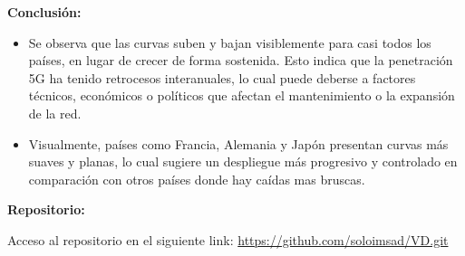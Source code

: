 \documentclass[12pt, a4paper]{article}
\begin{document}
\textbf{Conclusión:}  
\begin{itemize}
    \item Se observa que las curvas suben y bajan visiblemente para casi todos los países, en lugar de crecer de forma sostenida. Esto indica que la penetración 5G ha tenido retrocesos interanuales, lo cual puede deberse a factores técnicos, económicos o políticos que afectan el mantenimiento o la expansión de la red.
    \item Visualmente, países como Francia, Alemania y Japón presentan curvas más suaves y planas, lo cual sugiere un despliegue más progresivo y controlado en comparación con otros países donde hay caídas mas bruscas.

\end{itemize}


\textbf{Repositorio:}  
\label{anexo:repositorio}

Acceso al repositorio en el siguiente link: 
\url{https://github.com/soloimsad/VD.git}
\end{document}
